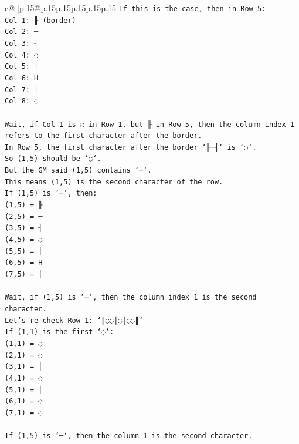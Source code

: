 \documentclass{article}
\begin{document}
{\begin{supertabular}{c@{$\;$}|p{.15\linewidth}@{}p{.15\linewidth}p{.15\linewidth}p{.15\linewidth}p{.15\linewidth}p{.15\linewidth}}
{{{\texttt{If this is the case, then in Row 5:} \\
\texttt{Col 1: ╟ (border)} \\
\texttt{Col 2: ─} \\
\texttt{Col 3: ┤} \\
\texttt{Col 4: ◌} \\
\texttt{Col 5: │} \\
\texttt{Col 6: H} \\
\texttt{Col 7: │} \\
\texttt{Col 8: ◌} \\
\\ 
\texttt{Wait, if Col 1 is ◌ in Row 1, but ╟ in Row 5, then the column index 1 refers to the first character after the border.} \\
\texttt{In Row 5, the first character after the border `╟─┤` is `◌`.} \\
\texttt{So (1,5) should be `◌`.} \\
\texttt{But the GM said (1,5) contains `─`.} \\
\texttt{This means (1,5) is the second character of the row.} \\
\texttt{If (1,5) is `─`, then:} \\
\texttt{(1,5) = ╟} \\
\texttt{(2,5) = ─} \\
\texttt{(3,5) = ┤} \\
\texttt{(4,5) = ◌} \\
\texttt{(5,5) = │} \\
\texttt{(6,5) = H} \\
\texttt{(7,5) = │} \\
\\ 
\texttt{Wait, if (1,5) is `─`, then the column index 1 is the second character.} \\
\texttt{Let's re{-}check Row 1: `║◌◌│◌│◌◌║`} \\
\texttt{If (1,1) is the first `◌`:} \\
\texttt{(1,1) = ◌} \\
\texttt{(2,1) = ◌} \\
\texttt{(3,1) = │} \\
\texttt{(4,1) = ◌} \\
\texttt{(5,1) = │} \\
\texttt{(6,1) = ◌} \\
\texttt{(7,1) = ◌} \\
\\ 
\texttt{If (1,5) is `─`, then the column 1 is the second character.} \\
}}}
\end{supertabular}}
\end{document}
